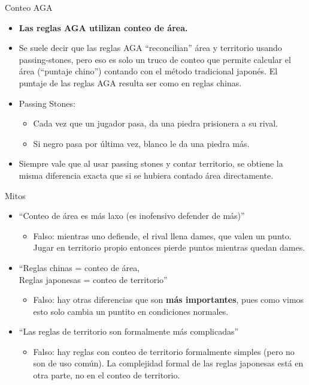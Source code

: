 \documentclass{beamer}
\begin{document}
\begin{frame}{Conteo AGA}

    \begin{itemize}
        \item \textbf{Las reglas AGA utilizan conteo de área.}
        \item Se suele decir que las reglas AGA ``reconcilian'' área y territorio usando passing-stones, pero eso es solo un truco de conteo que permite
          calcular el área (``puntaje chino'') contando con el método tradicional japonés. El puntaje de las reglas AGA resulta ser como en reglas chinas.
        \item Passing Stones: 
          \begin{itemize}
             \item Cada vez que un jugador pasa, da una piedra prisionera a su rival.
             \item Si negro pasa por última vez, blanco le da una piedra más.
          \end{itemize}
        \item Siempre vale que al usar passing stones y contar territorio, se obtiene la misma diferencia exacta que si se hubiera contado área directamente.
    \end{itemize}
  
\end{frame}

\begin{frame}{Mitos}

    \begin{itemize}
        \item ``Conteo de área es más laxo (es inofensivo defender de más)''
          \begin{itemize}
             \item Falso: mientras uno defiende, el rival llena dames, que valen un punto. Jugar en territorio propio entonces pierde puntos mientras quedan dames.
          \end{itemize}
        \item ``Reglas chinas = conteo de área, \\Reglas japonesas = conteo de territorio''
          \begin{itemize}
             \item Falso: hay otras diferencias que son \textbf{más importantes}, pues como vimos esto solo cambia un puntito en condiciones normales.
          \end{itemize}
        \item ``Las reglas de territorio son formalmente más complicadas''
          \begin{itemize}
             \item Falso: hay reglas con conteo de territorio formalmente simples (pero no son de uso común). La complejidad formal de las reglas japonesas está en otra parte, no en el conteo de territorio.
          \end{itemize}
    \end{itemize}
  
\end{frame}
\end{document}
